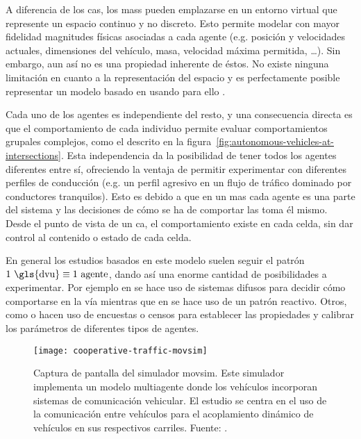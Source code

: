 A diferencia de los \acp{ca}, los \acp{mas} pueden emplazarse en un entorno virtual que represente un espacio continuo y no discreto. Esto permite modelar con mayor fidelidad magnitudes físicas asociadas a cada agente (e.g. posición y velocidades actuales, dimensiones del vehículo, masa, velocidad máxima permitida, \ldots). Sin embargo, aun así no es una propiedad inherente de éstos. No existe ninguna limitación en cuanto a la representación del espacio y es perfectamente posible representar un modelo basado en  usando para ello .

Cada uno de los agentes es independiente del resto, y una consecuencia directa es que el comportamiento de cada individuo permite evaluar comportamientos grupales complejos, como el descrito en la figura~\ref{fig:autonomous-vehicles-at-intersections}. Esta independencia da la posibilidad de tener todos los agentes diferentes entre sí, ofreciendo la ventaja de permitir experimentar con diferentes perfiles de conducción (e.g. un perfil agresivo en un flujo de tráfico dominado por conductores tranquilos). Esto es debido a que en un \ac{mas} cada agente es una parte del sistema y las decisiones de cómo se ha de comportar las toma él mismo. Desde el punto de vista de un \ac{ca}, el comportamiento existe en cada celda, sin dar control al contenido o estado de cada celda.

En general los estudios basados en este modelo suelen seguir el patrón $1 \text{ \gls{dvu}} \equiv 1 \text{ agente}$, dando así una enorme cantidad de posibilidades a experimentar. Por ejemplo en \cite{Das} se hace uso de sistemas difusos para decidir cómo comportarse en la vía mientras que en \cite{Ehlert2001} se hace uso de un patrón reactivo. Otros, como \cite{Dia2002} o \cite{Balmer} hacen uso de encuestas o censos para establecer las propiedades y calibrar los parámetros de diferentes tipos de agentes.

\begin{figure}
	\centering
	\texttt{[image: cooperative-traffic-movsim]}
	\caption[Captura de pantalla del simulador \gls{movsim}]{Captura de pantalla del simulador \gls{movsim}. Este simulador implementa un modelo multiagente donde los vehículos incorporan sistemas de comunicación vehicular. El estudio se centra en el uso de la comunicación entre vehículos para el acoplamiento dinámico de vehículos en sus respectivos carriles. Fuente: \cite{Gu2015}.}
	\label{fig:cooperative-traffic-movsim}
\end{figure}

